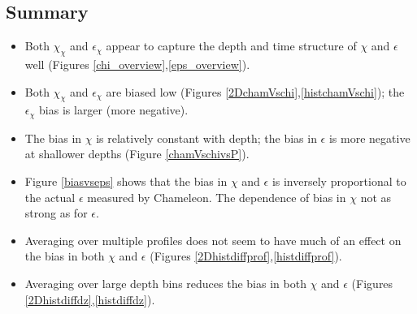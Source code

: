 \documentclass[11pt]{article}
\begin{document}
\clearpage
\subsection{Summary}

\begin{itemize}

\item Both $\chi_{\chi}$ and $\epsilon_{\chi}$ appear to capture the depth and time structure of $\chi$ and $\epsilon$ well (Figures \ref{chi_overview},\ref{eps_overview}).


\item Both $\chi_{\chi}$ and $\epsilon_{\chi}$ are biased low (Figures \ref{2DchamVschi},\ref{histchamVschi}); the $\epsilon_{\chi}$ bias is larger (more negative).

\item The bias in $\chi$ is relatively constant with depth; the bias in $\epsilon$ is more negative at shallower depths (Figure \ref{chamVschivsP}).

\item Figure \ref{biasvseps} shows that the bias in $\chi$ and $\epsilon$ is inversely proportional to the actual $\epsilon$ measured by Chameleon. The dependence of bias in $\chi$ not as strong as for $\epsilon$.

\item Averaging over multiple profiles does not seem to have much of an effect on the bias in both $\chi$ and $\epsilon$ (Figures \ref{2Dhistdiffprof},\ref{histdiffprof}).

\item Averaging over large depth bins reduces the bias in both $\chi$ and $\epsilon$ (Figures \ref{2Dhistdiffdz},\ref{histdiffdz}).


\end{itemize}





\end{document}
